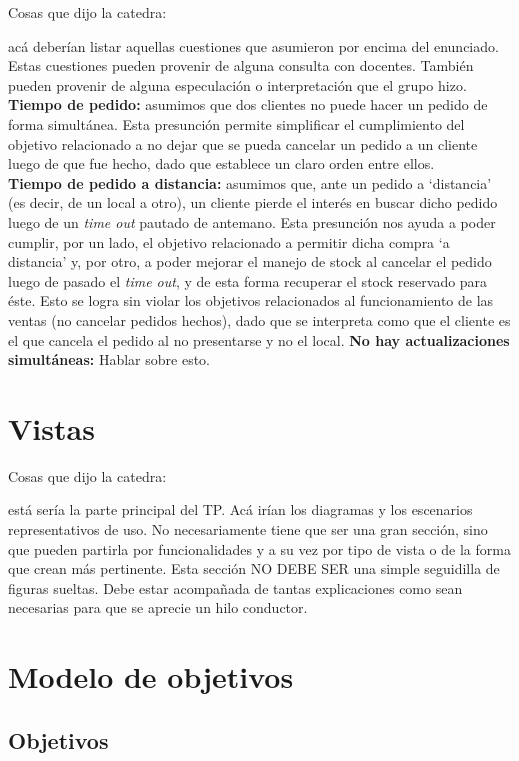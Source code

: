 \documentclass[a4paper,10pt]{article}
\begin{document}
Cosas que dijo la catedra:

acá deberían listar aquellas cuestiones que asumieron
por encima del enunciado. Estas cuestiones pueden provenir de alguna
consulta con docentes. También pueden provenir de alguna especulación
o interpretación que el grupo hizo.
\noindent
\textbf{Tiempo de pedido:} asumimos que dos clientes no puede hacer un pedido de forma simultánea. Esta presunción permite simplificar el cumplimiento del objetivo relacionado a no dejar que se pueda cancelar un pedido a un cliente luego de que fue hecho, dado que establece un claro orden entre ellos. \\
\textbf{Tiempo de pedido a distancia:} asumimos que, ante un pedido a `distancia' (es decir, de un local a otro), un cliente pierde el interés en buscar dicho pedido luego de un \textit{time out} pautado de antemano. Esta presunción nos ayuda a poder cumplir, por un lado, el objetivo relacionado a permitir dicha compra `a distancia' y, por otro, a poder mejorar el manejo de stock al cancelar el pedido luego de pasado el \textit{time out}, y de esta forma recuperar el stock reservado para éste. Esto se logra sin violar los objetivos relacionados al funcionamiento de las ventas (no cancelar pedidos hechos), dado que se interpreta como que el cliente es el que cancela el pedido al no presentarse y no el local.
\textbf{No hay actualizaciones simultáneas:} Hablar sobre esto.

\newpage
\section*{Vistas}

Cosas que dijo la catedra:

está sería la parte principal del TP. Acá irían los
diagramas y los escenarios representativos de uso. No necesariamente
tiene que ser una gran sección, sino que pueden partirla por
funcionalidades y a su vez por tipo de vista o de la forma que crean
más pertinente. Esta sección NO DEBE SER una simple seguidilla de
figuras sueltas. Debe estar acompañada de tantas explicaciones como
sean necesarias para que se aprecie un hilo conductor.

\section*{Modelo de objetivos}
\subsection*{Objetivos}
\noindent
\end{document}
